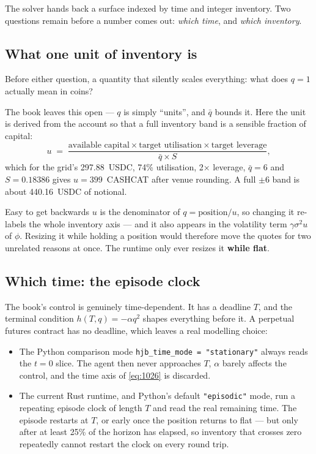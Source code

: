 \documentclass[11pt,a4paper]{article}
\newcommand{\code}[1]{\texttt{\small #1}}
\begin{document}
The solver hands back a surface indexed by time and integer inventory. Two
questions remain before a number comes out: \emph{which time}, and \emph{which
inventory}.

\subsection{What one unit of inventory is}
\label{sec:unit}

Before either question, a quantity that silently scales everything: what does
$q=1$ actually mean in coins?

The book leaves this open --- $q$ is simply ``units'', and $\bar{q}$ bounds it.
Here the unit is derived from the account so that a full inventory band is a
sensible fraction of capital:
\[
  u \;=\; \frac{\text{available capital}\times\text{target utilisation}
                \times\text{target leverage}}{\bar{q}\times S},
\]
which for the grid's 297.88~USDC, 74\% utilisation, 2$\times$ leverage,
$\bar q = 6$ and $S = 0.18386$ gives $u = 399$~CASHCAT after venue rounding.
A full $\pm6$ band is about 440.16~USDC of notional.

\begin{trap}{Easy to get backwards}
$u$ is the denominator of $q = \text{position}/u$, so changing it re-labels the
whole inventory axis --- and it also appears in the volatility term
$\gamma\sigma^{2}u$ of $\phi$. Resizing it while holding a position would
therefore move the quotes for two unrelated reasons at once. The runtime only
ever resizes it \textbf{while flat}.
\end{trap}

\subsection{Which time: the episode clock}

The book's control is genuinely time-dependent. It has a deadline $T$, and the
terminal condition $h(T,q) = -\alpha q^2$ shapes everything before it. A
perpetual futures contract has no deadline, which leaves a real modelling
choice:

\begin{itemize}[nosep]
  \item The Python comparison mode \code{hjb\_time\_mode = "stationary"}
    always reads the $t=0$ slice. The agent then never approaches $T$, $\alpha$
    barely affects the control, and the time axis of \eqref{eq:1026} is discarded.
  \item The current Rust runtime, and Python's default \code{"episodic"} mode,
    run a repeating episode clock of length $T$ and read the real remaining time.
    The episode restarts at $T$, or early once the position returns to flat ---
    but only after at least 25\% of the horizon has elapsed, so inventory that
    crosses zero repeatedly cannot restart the clock on every round trip.
\end{itemize}
\end{document}
